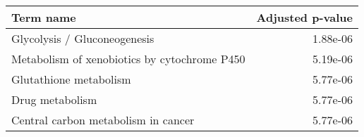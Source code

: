 \begin{tabular}{lr}
\toprule
                                   Term name &  Adjusted p-value \\
\midrule
                Glycolysis / Gluconeogenesis &          1.88e-06 \\
Metabolism of xenobiotics by cytochrome P450 &          5.19e-06 \\
                      Glutathione metabolism &          5.77e-06 \\
                             Drug metabolism &          5.77e-06 \\
         Central carbon metabolism in cancer &          5.77e-06 \\
\bottomrule
\end{tabular}
